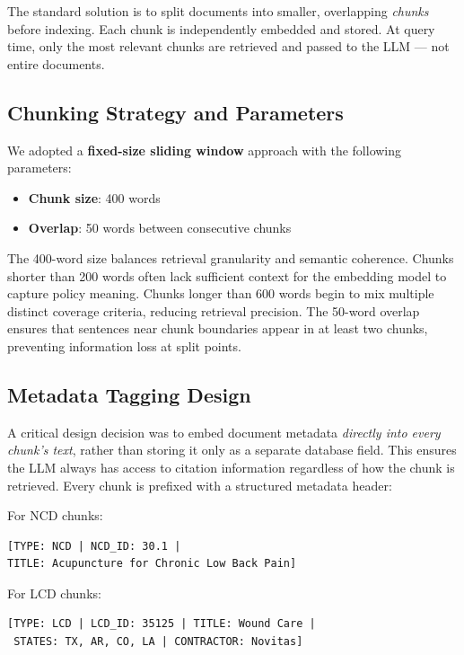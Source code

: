 \documentclass[12pt, letterpaper]{article}
\begin{document}
The standard solution is to split documents into smaller, overlapping \textit{chunks}
before indexing. Each chunk is independently embedded and stored. At query time, only
the most relevant chunks are retrieved and passed to the LLM --- not entire documents.

\subsection{Chunking Strategy and Parameters}

We adopted a \textbf{fixed-size sliding window} approach with the following parameters:

\begin{itemize}[noitemsep, topsep=4pt]
    \item \textbf{Chunk size}: 400 words
    \item \textbf{Overlap}: 50 words between consecutive chunks
\end{itemize}

The 400-word size balances retrieval granularity and semantic coherence. Chunks shorter
than 200 words often lack sufficient context for the embedding model to capture policy
meaning. Chunks longer than 600 words begin to mix multiple distinct coverage criteria,
reducing retrieval precision. The 50-word overlap ensures that sentences near chunk
boundaries appear in at least two chunks, preventing information loss at split points.

\subsection{Metadata Tagging Design}

A critical design decision was to embed document metadata \textit{directly into every
chunk's text}, rather than storing it only as a separate database field. This ensures
the LLM always has access to citation information regardless of how the chunk is
retrieved. Every chunk is prefixed with a structured metadata header:

For NCD chunks:
\begin{verbatim}
[TYPE: NCD | NCD_ID: 30.1 | 
TITLE: Acupuncture for Chronic Low Back Pain]
\end{verbatim}

For LCD chunks:
\begin{verbatim}
[TYPE: LCD | LCD_ID: 35125 | TITLE: Wound Care |
 STATES: TX, AR, CO, LA | CONTRACTOR: Novitas]
\end{verbatim}
\end{document}
